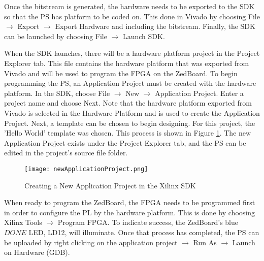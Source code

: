 Once the bitstream is generated, the hardware needs to be exported to the SDK so that the PS has platform to be coded on. This done in Vivado by choosing File $\rightarrow$ Export $\rightarrow$ Export Hardware and including the bitstream. Finally, the SDK can be launched by choosing File $\rightarrow$ Launch SDK.
\par
When the SDK launches, there will be a hardware platform project in the Project Explorer tab. This file contains the hardware platform that was exported from Vivado and will be used to program the FPGA on the ZedBoard. To begin programming the PS, an Application Project must be created with the hardware platform. In the SDK, choose File $\rightarrow$ New $\rightarrow$ Application Project. Enter a project name and choose Next. Note that the hardware platform exported from Vivado is selected in the Hardware Platform and is used to create the Application Project. Next, a template can be chosen to begin designing. For this project, the 'Hello World' template was chosen. This process is shown in Figure \ref{newApplicationProject}. The new Application Project exists under the Project Explorer tab, and the PS can be edited in the project's source file folder.

\begin{figure}[H]
	\centerline{\texttt{[image: newApplicationProject.png]}}
	\caption{Creating a New Application Project in the Xilinx SDK}
	\label{newApplicationProject}
\end{figure}

When ready to program the ZedBoard, the FPGA needs to be programmed first in order to configure the PL by the hardware platform. This is done by choosing Xilinx Tools $\rightarrow$ Program FPGA. To indicate success, the ZedBoard's blue $DONE$ LED, LD12, will illuminate. Once that process has completed, the PS can be uploaded by right clicking on the application project $\rightarrow$ Run As $\rightarrow$ Launch on Hardware (GDB).




